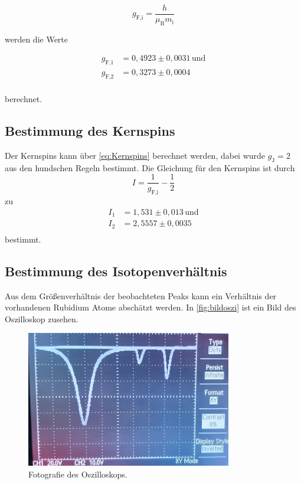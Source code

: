 \begin{equation*}
    g_{\text{F,i}} = \dfrac{h}{\mu_\text{B} m_\text{i}}
\end{equation*}

werden die Werte

\begin{align*}
    g_{\text{F,1}} &= 0,4923 \pm 0,0031 \, \text{und} \\
    g_{\text{F,2}} &= 0,3273 \pm 0,0004           \\
\end{align*}

berechnet.

\subsection{Bestimmung des Kernspins}

Der Kernspins kann über \eqref{eq:Kernspins} berechnet werden, dabei wurde $g_\text{J} = 2$ aus den hundschen Regeln bestimmt.
Die Gleichung für den Kernspins ist durch 
\begin{equation*}
    I = \dfrac{1}{g_{\text{F,i}}} - \dfrac{1}{2}
\end{equation*}
zu 
\begin{align*}
    I_1 &= 1,531  \pm 0,013 \, \text{und} \\
    I_2 &= 2,5557 \pm 0,0035           \\
\end{align*}
bestimmt.

\subsection{Bestimmung des Isotopenverhältnis}

Aus dem Größenverhältnis der beobachteten Peaks kann ein Verhältnis der vorhandenen Rubidium Atome abschätzt werden.  
In \autoref{fig:bildoszi} ist ein Bild des Oszilloskop zusehen.

\begin{figure}[H]
    \centering
    \includegraphics[width=0.8\textwidth]{Messdaten/v21_oszi.pdf}
    \caption{Fotografie des Oszilloskops.}
    \label{fig:bildoszi}
\end{figure}

